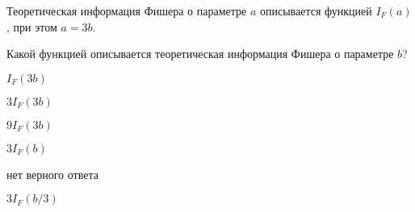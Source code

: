 
\begin{question}
Теоретическая информация Фишера о параметре \(a\) описывается функцией
\(I_F(a)\), при этом \(a = 3b\).

Какой функцией описывается теоретическая информация Фишера о параметре
\(b\)?
\begin{answerlist}
  \item \(I_F(3 b)\)
  \item \(3 I_F(3 b)\)
  \item \(9 I_F(3 b)\)
  \item \(3 I_F(b)\)
  \item нет верного ответа
  \item \(3 I_F(b/3)\)
\end{answerlist}
\end{question}


